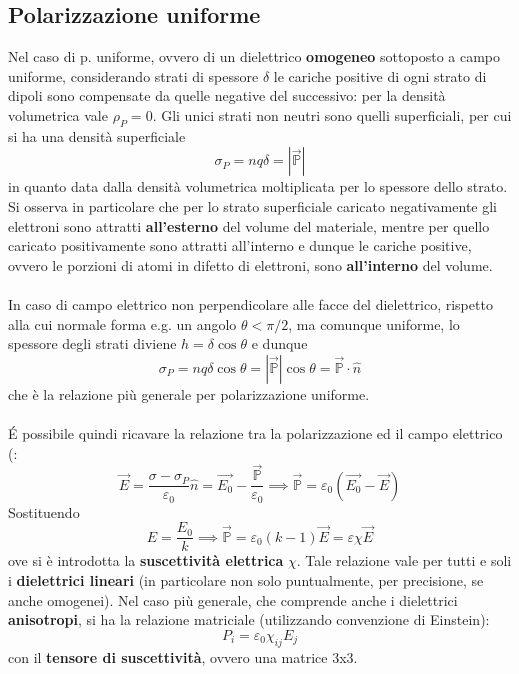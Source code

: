 \subsection{Polarizzazione uniforme}
Nel caso di p. uniforme, ovvero di un dielettrico \textbf{omogeneo} sottoposto a campo uniforme, considerando strati di spessore $\delta$ le cariche positive di ogni strato di dipoli sono compensate da quelle negative del successivo: per la densità volumetrica vale $\rho_P = 0$. Gli unici strati non neutri sono quelli superficiali, per cui si ha una densità superficiale
\[\sigma_P = nq \delta = |\vec{\mathbb{P}}|\]
in quanto data dalla densità volumetrica moltiplicata per lo spessore dello strato. Si osserva in particolare che per lo strato superficiale caricato negativamente gli elettroni sono attratti \textbf{all'esterno} del volume del materiale, mentre per quello caricato positivamente sono attratti all'interno e dunque le cariche positive, ovvero le porzioni di atomi in difetto di elettroni, sono \textbf{all'interno} del volume.
\\~\\
In caso di campo elettrico non perpendicolare alle facce del dielettrico, rispetto alla cui normale forma e.g. un angolo $\theta < \pi/2$, ma comunque uniforme, lo spessore degli strati diviene $h = \delta \cos \theta$ e dunque
\[\sigma_P = n q \delta \cos \theta = |\vec{\mathbb{P}}| \cos \theta = \vec{\mathbb{P}} \cdot \hat{n}\]
che è la relazione più generale per polarizzazione uniforme.
\\~\\
\'E possibile quindi ricavare la relazione tra la polarizzazione ed il campo elettrico (:
\[\vec{E} = \frac{\sigma - \sigma_P}{\varepsilon_0} \hat{n} = \vec{E_0} - \frac{\vec{\mathbb{P}}}{\varepsilon_0} \implies \vec{\mathbb{P}} = \varepsilon_0(\vec{E_0} - \vec{E})\]
Sostituendo
\[E = \frac{E_0}{k} \implies \vec{\mathbb{P}} = \varepsilon_0 (k-1) \vec{E} = \varepsilon \chi \vec{E}\]
ove si è introdotta la \textbf{suscettività elettrica} $\chi$. Tale relazione vale per tutti e soli i \textbf{dielettrici lineari} (in particolare non solo puntualmente, per precisione, se anche omogenei). Nel caso più generale, che comprende anche i dielettrici \textbf{anisotropi}, si ha la relazione matriciale (utilizzando convenzione di Einstein):
\[P_i = \varepsilon_0 \chi_{ij} E_j\]
con il \textbf{tensore di suscettività}, ovvero una matrice 3x3.

